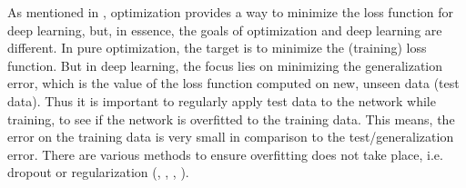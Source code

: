 \documentclass[12pt,DIV14,BCOR12mm,a4paper,footexclude,headinclude,halfparskip-,twoside,openright,cleardoubleempty,idxtotoc,bibtotoc,listtotoc,abstracton]{scrreprt} %
\numberwithin{equation}{chapter}
\begin{document}
As mentioned in \cite{DeepLearningDive}, optimization provides a way to minimize the loss function for deep learning, but, in essence, the goals of optimization and deep learning are different. In pure optimization, the target is to minimize the (training) loss function. But in deep learning, the focus lies on minimizing the generalization error, which is the value of the loss function computed on new, unseen data (test data). Thus it is important to regularly apply test data to the network while training, to see if the network is overfitted to the training data. This means, the error on the training data is very small in comparison to the test/generalization error. There are various methods to ensure overfitting does not take place, i.e. dropout or regularization (\cite{Goodfellow-et-al-2016}, \cite{Nielsen-Michael}, \cite{DeepLearningDive}, \cite{Bishop}).\\
\end{document}
